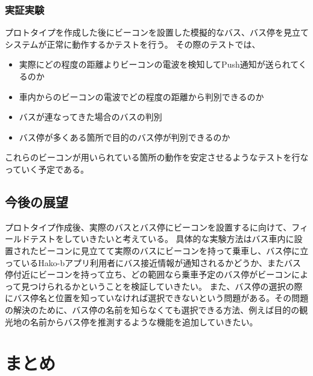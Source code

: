 \documentclass[openany,11pt,papersize]{jsbook}
\begin{document}

\subsection{実証実験}
プロトタイプを作成した後にビーコンを設置した模擬的なバス、バス停を見立てシステムが正常に動作するかテストを行う。
その際のテストでは、
\begin{itemize}

\item 実際にどの程度の距離よりビーコンの電波を検知してPush通知が送られてくるのか
\item 車内からのビーコンの電波でどの程度の距離から判別できるのか
\item バスが連なってきた場合のバスの判別
\item バス停が多くある箇所で目的のバス停が判別できるのか

\end{itemize}
これらのビーコンが用いられている箇所の動作を安定させるようなテストを行なっていく予定である。


\section{今後の展望}
プロトタイプ作成後、実際のバスとバス停にビーコンを設置するに向けて、フィールドテストをしていきたいと考えている。
具体的な実験方法はバス車内に設置されたビーコンに見立てて実際のバスにビーコンを持って乗車し、バス停に立っているHako-bアプリ利用者にバス接近情報が通知されるかどうか、またバス停付近にビーコンを持って立ち、どの範囲なら乗車予定のバス停がビーコンによって見つけられるかということを検証していきたい。
また、バス停の選択の際にバス停名と位置を知っていなければ選択できないという問題がある。その問題の解決のために、バス停の名前を知らなくても選択できる方法、例えば目的の観光地の名前からバス停を推測するような機能を追加していきたい。



\chapter{まとめ}
\end{document}

